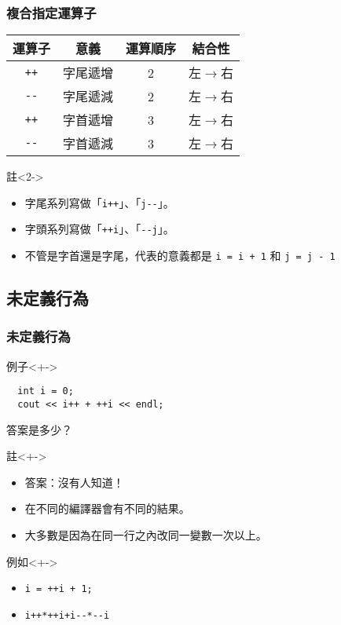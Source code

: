 \documentclass[utf8]{beamer}
\begin{document}
\begin{CJK}{UTF8}{bkai}
\begin{frame}[fragile]
  \frametitle{複合指定運算子}
  \begin{table}[h]
    \begin{tabular}{|c|c|c|c|}
    \hline
    運算子            & 意義         & 運算順序 & 結合性\\
    \hline
    \lstinline{++}{} & 字尾遞增      & 2     & 左$\rightarrow$右\\
    \hline
    \lstinline{--}{} & 字尾遞減      & 2     & 左$\rightarrow$右\\
    \hline
    \lstinline{++}{} & 字首遞增      & 3     & 左$\rightarrow$右\\
    \hline
    \lstinline{--}{} & 字首遞減      & 3     & 左$\rightarrow$右\\
    \hline
    \end{tabular}
  \end{table}
  \begin{exampleblock}{註}<2->
    \begin{itemize}
    \item 字尾系列寫做「\lstinline{i++}{}」、「\lstinline{j--}{}」。
    \item<3-> 字頭系列寫做「\lstinline{++i}{}」、「\lstinline{--j}{}」。
    \item<4-> 不管是字首還是字尾，代表的意義都是 \lstinline{i = i + 1}{} 和 \lstinline{j = j - 1}{}
    \end{itemize}
  \end{exampleblock}
\end{frame}

\subsection{未定義行為}

\begin{frame}[fragile]
  \frametitle{未定義行為}
  \begin{exampleblock}{例子}<+->
    \begin{lstlisting}
  int i = 0;
  cout << i++ + ++i << endl;
    \end{lstlisting}
    答案是多少？
  \end{exampleblock}
  \begin{block}{註}<+->
    \begin{itemize}
    \item 答案：\alert{沒有人知道！}
    \item<+-> 在不同的編譯器會有不同的結果。
    \item<+-> 大多數是因為在同一行之內改同一變數一次以上。
    \end{itemize}
  \end{block}
  \begin{exampleblock}{例如}<+->
    \begin{itemize}
    \item \lstinline{i = ++i + 1;}{}
    \item<+-> \lstinline{i++*++i+i--*--i}{}
    \end{itemize}
  \end{exampleblock}
\end{frame}


\end{CJK}
\end{document}
